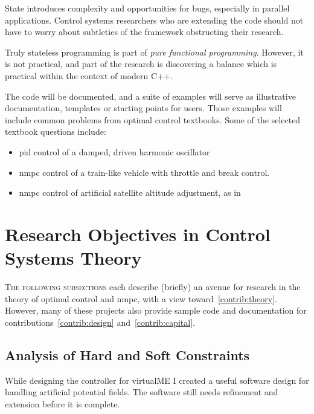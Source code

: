 \begin{description}
  State introduces complexity and opportunities for bugs, especially in parallel
  applications. Control systems researchers who are extending the code should
  not have to worry about subtleties of the framework obstructing their
  research.

  Truly stateless programming is part of \emph{pure functional programming}.
  However, it is not practical, and part of the research is discovering a
  balance which is practical within the context of modern C++.
\end{description}

The code will be documented, and a suite of examples will serve as illustrative
documentation, templates or starting points for users. Those examples will
include common problems from optimal control textbooks. Some of the selected
textbook questions include:
%
\begin{itemize}
  \item \ac{pid} control of a damped, driven harmonic oscillator
  \item \ac{nmpc} control of a train-like vehicle with throttle and break control.~\cite[p.~5]{Kirk2004}
  \item \ac{nmpc} control of artificial satellite altitude adjustment, as in~\cite[p.~1]{Vinter2010}
\end{itemize}



\section{Research Objectives in Control Systems Theory}


\textsc{The following subsections} each describe (briefly) an avenue for
research in the theory of optimal control and \ac{nmpc}, with a view
toward~\ref{contrib:theory}. However, many of these projects also provide sample
code and documentation for contributions~\ref{contrib:design}
and~\ref{contrib:capital}.


\subsection{Analysis of Hard and Soft Constraints}

While designing the controller for virtualME I created a useful software
design for handling artificial potential fields. The software still needs
refinement and extension before it is complete.

